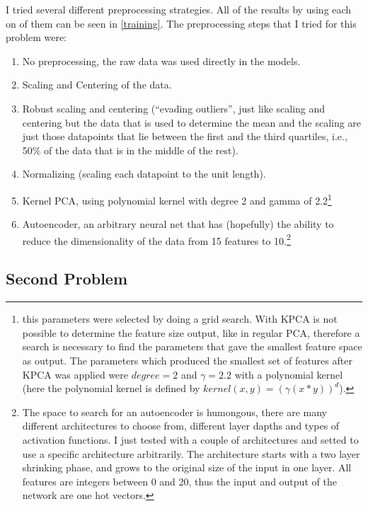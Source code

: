 \documentclass[format=acmtog]{acmart}
\providecommand{\tightlist}{%
  \setlength{\itemsep}{0pt}\setlength{\parskip}{0pt}}
\begin{document}
I tried several different preprocessing strategies. All of the results
by using each on of them can be seen in \ref{training}. The
preprocessing steps that I tried for this problem were:

\begin{enumerate}
\def\labelenumi{\arabic{enumi}.}
\tightlist
\item
  No preprocessing, the raw data was used directly in the models.
\item
  Scaling and Centering of the data.
\item
  Robust scaling and centering (``evading outliers'', just like scaling
  and centering but the data that is used to determine the mean and the
  scaling are just those datapoints that lie between the first and the
  third quartiles, i.e., 50\% of the data that is in the middle of the
  rest).
\item
  Normalizing (scaling each datapoint to the unit length).
\item
  Kernel PCA, using polynomial kernel with degree 2 and gamma of
  2.2\footnote{this parameters were selected by doing a grid search.
    With KPCA is not possible to determine the feature size output, like
    in regular PCA, therefore a search is necessary to find the
    parameters that gave the smallest feature space as output. The
    parameters which produced the smallest set of features after KPCA
    was applied were \(degree = 2\) and \(\gamma = 2.2\) with a
    polynomial kernel (here the polynomial kernel is defined by
    \(kernel(x,y) = (\gamma(x*y))^d\)).}
\item
  Autoencoder, an arbitrary neural net that has (hopefully) the ability
  to reduce the dimensionality of the data from 15 features to
  10.\footnote{The space to search for an autoencoder is humongous,
    there are many different architectures to choose from, different
    layer dapths and types of activation functions. I just tested with a
    couple of architectures and setted to use a specific architecture
    arbitrarily. The architecture starts with a two layer shrinking
    phase, and grows to the original size of the input in one layer. All
    features are integers between 0 and 20, thus the input and output of
    the network are one hot vectors.}
\end{enumerate}

\subsection{Second Problem}\label{second-problem}
\end{document}
